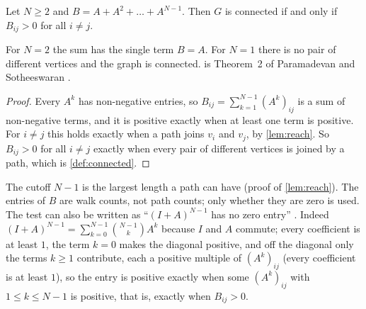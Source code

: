 \begin{theorem}\label{thm:sum}
Let $N\ge2$ and $B=A+A^2+\dots+A^{N-1}$. Then $G$ is connected if and only if $B_{ij}>0$ for all $i\ne j$.
\end{theorem}
For $N=2$ the sum has the single term $B=A$.
For $N=1$ there is no pair of different vertices and the graph is connected.  is Theorem~2 of Paramadevan and Sotheeswaran \cite[p.~17]{paramadevan2021adjacency}.
\begin{proof}
Every $A^k$ has non-negative entries, so $B_{ij}=\sum_{k=1}^{N-1}(A^k)_{ij}$ is a sum of non-negative terms, and it is positive exactly when at least one term is positive. For $i\ne j$ this holds exactly when a path joins $v_i$ and $v_j$, by \cref{lem:reach}. So $B_{ij}>0$ for all $i\ne j$ exactly when every pair of different vertices is joined by a path, which is \cref{def:connected}.
\end{proof}
The cutoff $N-1$ is the largest length a path can have (proof of \cref{lem:reach}). The entries of $B$ are walk counts, not path counts; only whether they are zero is used. The test can also be written as ``$(I+A)^{N-1}$ has no zero entry'' \cite[Proposition~3, p.~2]{gotti18211}\cite[Theorem~2, p.~1]{bai2025adjacency}. Indeed $(I+A)^{N-1}=\sum_{k=0}^{N-1}\binom{N-1}{k}A^k$ because $I$ and $A$ commute; every coefficient is at least $1$, the term $k=0$ makes the diagonal positive, and off the diagonal only the terms $k\ge1$ contribute, each a positive multiple of $(A^k)_{ij}$ (every coefficient is at least $1$), so the entry is positive exactly when some $(A^k)_{ij}$ with $1\le k\le N-1$ is positive, that is, exactly when $B_{ij}>0$.
